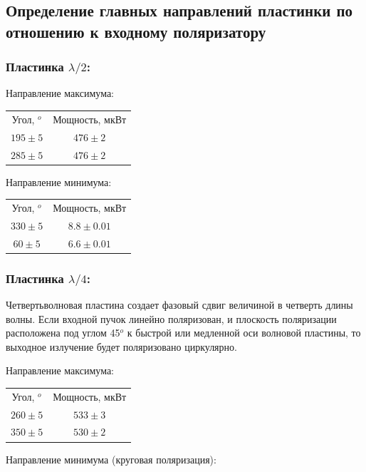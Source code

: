 \documentclass[a4paper, 12pt]{article}
\begin{document}
\subsection{Определение главных направлений пластинки по отношению к входному поляризатору}
\subsubsection{Пластинка $\lambda/2$:}
Направление максимума:


\begin{center}
\begin{tabular}{ c c }

Угол, $^o$ & Мощность, мкВт\\
$195\pm 5$ &$476\pm2$\\
$285\pm 5 $& $476\pm2$\\
\end{tabular}
\end{center}
Направление минимума:

\begin{center}
\begin{tabular}{ c c }

Угол, $^o$ & Мощность, мкВт\\
$330\pm 5 $&$8.8\pm0.01$\\
$60 \pm 5$& $6.6\pm0.01$\\
\end{tabular}
\end{center}


\subsubsection{Пластинка $\lambda/4$:}

Четвертьволновая пластина создает фазовый сдвиг величиной в четверть длины волны. Если входной пучок линейно поляризован, и плоскость поляризации расположена под углом 45$^o$ к быстрой или медленной оси волновой пластины, то выходное излучение будет поляризовано циркулярно.

Направление максимума:


\begin{center}
\begin{tabular}{ c c }

Угол, $^o$ & Мощность, мкВт\\
$260\pm 5$ &$533\pm3$\\
$350\pm 5$ & $530\pm2$\\
\end{tabular}
\end{center}
Направление минимума (круговая поляризация):
\end{document}
